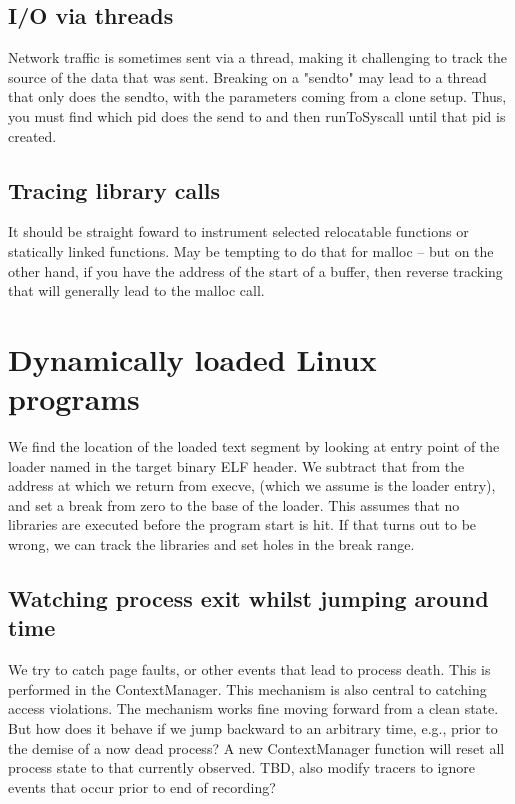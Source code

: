 \documentclass[titlepage]{article}
\begin{document}
\begin{appendices}
\subsection{I/O via threads}
Network traffic is sometimes sent via a thread, making it challenging to track the source of the data that was sent.  Breaking on a "sendto" may
lead to a thread that only does the sendto, with the parameters coming from a clone setup.  Thus, you must find which pid does the send to and then
runToSyscall until that pid is created.

\subsection{Tracing library calls}
It should be straight foward to instrument selected relocatable functions or statically linked functions.
May be tempting to do that for malloc -- but on the other hand, if you have the address of the start of a buffer, then reverse tracking that
will generally lead to the malloc call.

\section{Dynamically loaded Linux programs}
We find the location of the loaded text segment by looking at entry point of the loader named in the target binary ELF header.  We subtract that from the address
at which we return from execve, (which we assume is the loader entry), and set a break from zero to the base of the loader.  This assumes that no libraries are
executed before the program start is hit.  If that turns out to be wrong, we can track the libraries and set holes in the break range.


\subsection{Watching process exit whilst jumping around time}
We try to catch page faults, or other events that lead to process death.  This is performed in the ContextManager.  
This mechanism is also central to catching access violations.  The mechanism works fine moving forward from a clean state.  But
how does it behave if we jump backward to an arbitrary time, e.g., prior to the demise of a now dead process?  A new ContextManager function
will reset all process state to that currently observed.  TBD, also modify tracers to ignore events that occur prior to end of recording?


\end{appendices}
\end{document}
